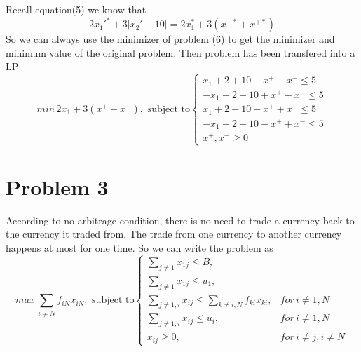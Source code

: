 \documentclass[a4paper]{article}
\begin{document}
Recall equation(5) we know that
\begin{equation}  
2x_1'^*+3|x_2'-10| = 2x_1^*+3(x^{+*}+x^{+*})
\end{equation}  
So we can always use the minimizer of problem (6) to get the minimizer and minimum value of the original problem. Then problem has been transfered into a LP
\begin{equation}  
min \,2x_1+3(x^++x^-) , \text{ subject to}
\left\{  
             \begin{array}{ll}
             x_1+2+10+x^+-x^-\leq 5\\
             -x_1-2+10+x^+-x^-\leq 5\\
             x_1+2-10-x^++x^-\leq 5\\
             -x_1-2-10-x^++x^-\leq 5\\
             x^+,x^-\geq 0
             \end{array}  
\right.  
\end{equation}  

\section{Problem 3}
According to no-arbitrage condition, there is no need to trade a currency back to the currency it traded from. The trade from one currency to another currency happens at most for one time. So we can write the problem as 
\begin{equation}  
max \,\sum_{i \not= N} f_{iN} x_{iN}, \text{ subject to}
\left\{  
             \begin{array}{ll}
             \sum_{j\not= 1}x_{1j}\leq B,\\
             \sum_{j\not= 1}x_{1j}\leq u_1,\\
             \sum_{j\not= 1, i}x_{ij}\leq \sum_{k\not=i,N}f_{ki} x_{ki},& for\, i\not= 1,N\\
             \sum_{j\not= 1, i}x_{ij}\leq u_i,& for\, i\not= 1,N\\
             x_{ij}\geq 0, & for\, i\not= j,i\not=N
             \end{array}  
\right.  
\end{equation}  
\end{document}
